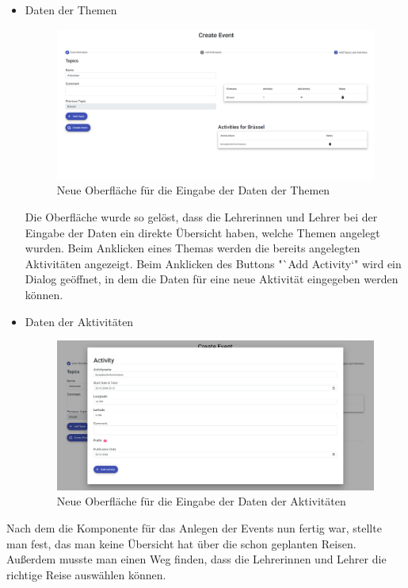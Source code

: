 \begin{itemize}
    \newpage
    \item Daten der Themen
    \begin{figure}[h]
        \centering
        \includegraphics[scale=0.27]{pics/new_create_3.png}
        \caption{Neue Oberfläche für die Eingabe der Daten der Themen}
        \label{lst:new_create_event_3}
    \end{figure} 
    Die Oberfläche wurde so gelöst, dass die Lehrerinnen und Lehrer bei der Eingabe der Daten ein direkte Übersicht haben, welche Themen angelegt wurden. Beim Anklicken eines Themas werden die bereits angelegten Aktivitäten angezeigt. Beim Anklicken des Buttons "`Add Activity`" wird ein Dialog geöffnet, in dem die Daten für eine neue Aktivität eingegeben werden können.  

    \item Daten der Aktivitäten
    \begin{figure}[h]
        \centering
        \includegraphics[scale=0.27]{pics/new_create_3_1.png}
        \caption{Neue Oberfläche für die Eingabe der Daten der Aktivitäten}
        \label{lst:new_create_event_3_1}
    \end{figure}    
\end{itemize}

Nach dem die Komponente für das Anlegen der Events nun fertig war, stellte man fest, das man keine Übersicht hat über die schon geplanten Reisen. Außerdem musste man einen Weg finden, dass die Lehrerinnen und Lehrer die richtige Reise auswählen können.

